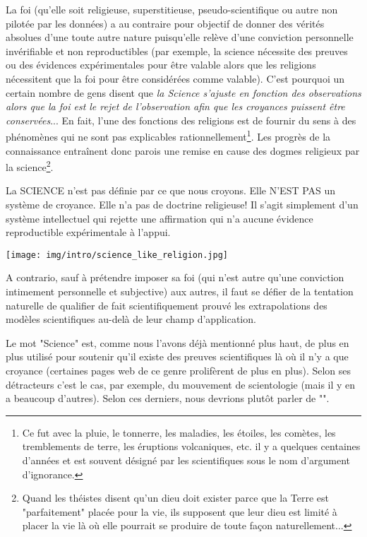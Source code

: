 	La foi (qu'elle soit religieuse, superstitieuse, pseudo-scientifique ou autre non pilot\'ee par les donn\'ees) a au contraire pour objectif de donner des v\'erit\'es absolues d'une toute autre nature puisqu'elle relève d'une conviction personnelle inv\'erifiable et non reproductibles (par exemple, la science n\'ecessite des preuves ou des \'evidences exp\'erimentales pour être valable alors que les religions n\'ecessitent que la foi pour être consid\'er\'ees comme valable). C'est pourquoi un certain nombre de gens disent que \textit{la Science s'ajuste en fonction des observations alors que la foi est le rejet de l'observation afin que les croyances puissent être conserv\'ees}... En fait, l'une des fonctions des religions est de fournir du sens à des ph\'enomènes qui ne sont pas explicables rationnellement\footnote{Ce fut avec la pluie, le tonnerre, les maladies, les \'etoiles, les comètes, les tremblements de terre, les \'eruptions volcaniques, etc. il y a quelques centaines d'ann\'ees et est souvent d\'esign\'e par les scientifiques sous le nom d'argument d'ignorance. }. Les progrès de la connaissance entraînent donc parois une remise en cause des dogmes religieux par la science\footnote{Quand les théistes disent qu'un dieu doit exister parce que la Terre est "parfaitement" placée pour la vie, ils supposent que leur dieu est limité à placer la vie là où elle pourrait se produire de toute façon naturellement...}. 
	\begin{fquote}La SCIENCE n'est pas définie par ce que nous croyons. Elle N'EST PAS un système de croyance. Elle n'a pas de doctrine religieuse! Il s'agit simplement d'un système intellectuel qui rejette une affirmation qui n'a aucune évidence reproductible expérimentale à l'appui.
 	\end{fquote}
 	\begin{center}
		\texttt{[image: img/intro/science\_like\_religion.jpg]}
	\end{center}
	A contrario, sauf à pr\'etendre imposer sa foi (qui n'est autre qu'une conviction intimement personnelle et subjective) aux autres, il faut se d\'efier de la tentation naturelle de qualifier de fait scientifiquement prouv\'e les extrapolations des modèles scientifiques au-delà de leur champ d'application.
	
	Le mot "Science" est, comme nous l'avons d\'ejà mentionn\'e plus haut, de plus en plus utilis\'e pour soutenir qu'il existe des preuves scientifiques là où il n'y a que croyance (certaines pages web de ce genre prolifèrent de plus en plus). Selon ses d\'etracteurs c'est le cas, par exemple, du mouvement de scientologie (mais il y en a beaucoup d'autres). Selon ces derniers, nous devrions plutôt parler de "".

